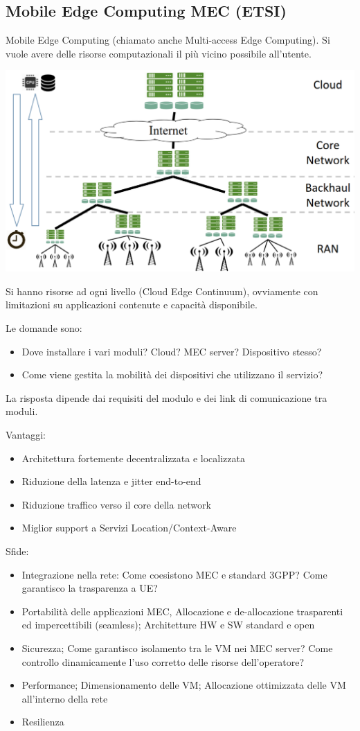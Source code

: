 \subsection{Mobile Edge Computing MEC (ETSI)}

Mobile Edge Computing (chiamato anche Multi-access Edge Computing). Si vuole avere delle risorse computazionali il più vicino possibile all'utente. 
\begin{center}
	\includegraphics[width=0.9\linewidth]{img/5g/mec}
\end{center}
Si hanno risorse ad ogni livello (Cloud Edge Continuum), ovviamente con limitazioni su applicazioni contenute e capacità disponibile.

Le domande sono: 
\begin{itemize}
	\item Dove installare i vari moduli? Cloud? MEC server? Dispositivo stesso? 
	\item Come viene gestita la mobilità dei dispositivi che utilizzano il servizio?
\end{itemize}
La risposta dipende dai requisiti del modulo e dei link di comunicazione tra moduli.

Vantaggi: 
\begin{itemize}
	\item Architettura fortemente decentralizzata e localizzata
	\item Riduzione della latenza e jitter end-to-end
	\item Riduzione traffico verso il core della network
	\item Miglior support a Servizi Location/Context-Aware
\end{itemize}

Sfide: 
\begin{itemize}
	\item Integrazione nella rete: Come coesistono MEC e standard 3GPP? Come garantisco la trasparenza a UE?
	\item Portabilità delle applicazioni MEC, Allocazione e de-allocazione trasparenti ed impercettibili (seamless); Architetture HW e SW standard e open
	\item Sicurezza; Come garantisco isolamento tra le VM nei MEC server? Come controllo dinamicamente l'uso corretto delle risorse
	dell'operatore?
	\item Performance; Dimensionamento delle VM; Allocazione ottimizzata delle VM all'interno della rete
	\item Resilienza
\end{itemize}

